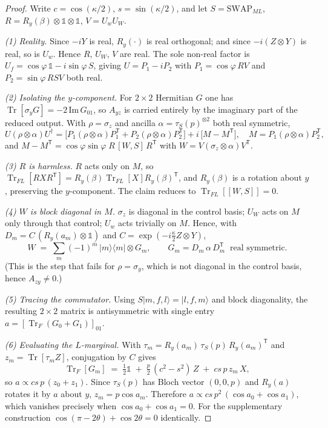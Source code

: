 \documentclass[11pt,a4paper]{article}
\theoremstyle{definition}
\theoremstyle{remark}
\DeclareMathOperator{\Tr}{Tr}
\newcommand{\I}{\mathbb{1}}
\begin{document}
\begin{proof}
Write $c = \cos(\kappa/2)$, $s = \sin(\kappa/2)$, and let $S = \mathrm{SWAP}_{ML}$, $R = R_y(\beta)\otimes\I\otimes\I$, $V = U_wU_W$.

\emph{(1) Reality.} Since $-iY$ is real, $R_y(\cdot)$ is real orthogonal; and since $-i(Z\otimes Y)$ is real, so is $U_w$. Hence $R$, $U_W$, $V$ are real. The sole non-real factor is $U_f = \cos\varphi\,\I - i\sin\varphi\,S$, giving $U = P_1 - iP_2$ with $P_1 = \cos\varphi\,RV$ and $P_2 = \sin\varphi\,RSV$ both real.

\emph{(2) Isolating the $y$-component.} For $2\times2$ Hermitian $G$ one has $\Tr[\sigma_yG] = -2\,\mathrm{Im}\,G_{01}$, so $A_{yz}$ is carried entirely by the imaginary part of the reduced output. With $\rho = \sigma_z$ and ancilla $\alpha = \tau_S(p)^{\otimes2}$ both real symmetric,
\[
  U(\rho\otimes\alpha)U^{\dagger} = \big[P_1(\rho\otimes\alpha)P_1^{\mathsf T} + P_2(\rho\otimes\alpha)P_2^{\mathsf T}\big] + i\,\big[M - M^{\mathsf T}\big],
  \quad M = P_1(\rho\otimes\alpha)P_2^{\mathsf T},
\]
and $M - M^{\mathsf T} = \cos\varphi\sin\varphi\;R\,[W,S]\,R^{\mathsf T}$ with $W = V(\sigma_z\otimes\alpha)V^{\mathsf T}$.

\emph{(3) $R$ is harmless.} $R$ acts only on $M$, so $\Tr_{FL}[RXR^{\mathsf T}] = R_y(\beta)\Tr_{FL}[X]R_y(\beta)^{\mathsf T}$, and $R_y(\beta)$ is a rotation about $y$, preserving the $y$-component. The claim reduces to $\Tr_{FL}[[W,S]] = 0$.

\emph{(4) $W$ is block diagonal in $M$.} $\sigma_z$ is diagonal in the control basis; $U_W$ acts on $M$ only through that control; $U_w$ acts trivially on $M$. Hence, with $D_m = C\,(R_y(a_m)\otimes\I)$ and $C = \exp(-i\tfrac\kappa2 Z\otimes Y)$,
\[
  W \;=\; \sum_{m} (-1)^m\, |m\rangle\!\langle m| \otimes G_m, \qquad G_m = D_m\,\alpha\,D_m^{\mathsf T} \ \text{ real symmetric}.
\]
(This is the step that fails for $\rho = \sigma_y$, which is not diagonal in the control basis, hence $A_{zy} \neq 0$.)

\emph{(5) Tracing the commutator.} Using $S|m,f,l\rangle = |l,f,m\rangle$ and block diagonality, the resulting $2\times2$ matrix is antisymmetric with single entry $a = [\Tr_F(G_0 + G_1)]_{01}$.

\emph{(6) Evaluating the $L$-marginal.} With $\tau_m = R_y(a_m)\,\tau_S(p)\,R_y(a_m)^{\mathsf T}$ and $z_m = \Tr[\tau_m Z]$, conjugation by $C$ gives
\[
  \Tr_F[G_m] \;=\; \tfrac12\I \;+\; \tfrac{p}{2}\,(c^2-s^2)\,Z \;+\; cs\,p\,z_m\,X,
\]
so $a \propto cs\,p\,(z_0+z_1)$. Since $\tau_S(p)$ has Bloch vector $(0,0,p)$ and $R_y(a)$ rotates it by $a$ about $y$, $z_m = p\cos a_m$. Therefore $a \propto cs\,p^2\,(\cos a_0 + \cos a_1)$, which vanishes precisely when $\cos a_0 + \cos a_1 = 0$. For the supplementary construction $\cos(\pi-2\theta) + \cos 2\theta = 0$ identically.
\end{proof}
\end{document}
